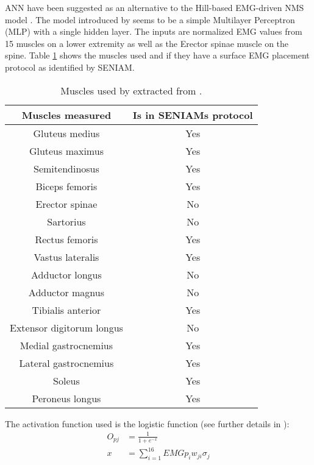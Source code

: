\ac{ANN} have been suggested as an alternative to the Hill-based EMG-driven NMS model \cite{Sepulveda1993, Rosen1999}.
The model introduced by  seems to be a simple Multilayer Perceptron (MLP) with a single hidden layer. 
The inputs are normalized EMG values from 15 muscles on a lower extremity as well as the Erector spinae muscle on the spine. 
Table \ref{tab:SepulvedaTable} shows the muscles used and if they have a surface EMG placement protocol as identified by SENIAM.
\begin{table}[t]
    \centering
    \begin{tabular}{c|c}
        Muscles measured & Is in SENIAMs protocol \\ \hline
        Gluteus medius              & Yes \\
        Gluteus maximus             & Yes \\
        Semitendinosus              & Yes \\
        Biceps femoris              & Yes \\
        Erector spinae              & No  \\
        Sartorius                   & No  \\
        Rectus femoris              & Yes \\
        Vastus lateralis            & Yes \\
        Adductor longus             & No  \\
        Adductor magnus             & No  \\
        Tibialis anterior           & Yes \\
        Extensor digitorum longus   & No  \\
        Medial gastrocnemius        & Yes \\
        Lateral gastrocnemius       & Yes \\
        Soleus                      & Yes \\
        Peroneus longus             & Yes
    \end{tabular}
    \caption{Muscles used by  extracted from \cite[Tab. 1]{Sepulveda1993}. }
    \label{tab:SepulvedaTable}
\end{table}
The activation function used is the logistic function (see further details in \cite[eq. (1)]{Sepulveda1993}):
\begin{align}
    O_{pj} &= \frac{1}{1+e^{-x}}\\
    x &= \sum_{i=1}^{16}EMG p_i w_{ji} \sigma_j
\end{align}
